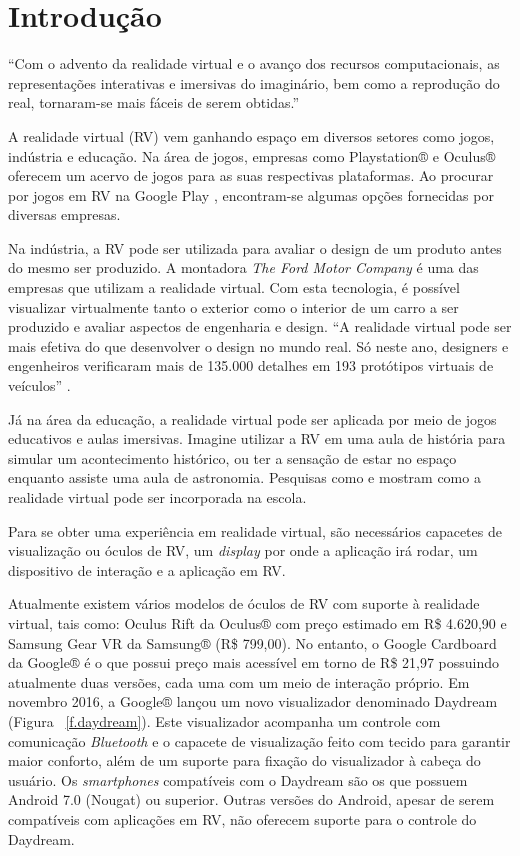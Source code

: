 \chapter{Introdução}
\label{c.introducao}

“Com o advento da realidade virtual e o avanço dos recursos computacionais, as representações interativas e imersivas do imaginário, bem como a reprodução do real, tornaram-se mais fáceis de serem obtidas.” \cite[p. ~9]{torilivro}

A realidade virtual (RV) vem ganhando espaço em diversos setores como jogos, indústria e educação. Na área de jogos, empresas como Playstation® e Oculus® oferecem um acervo de jogos para as suas respectivas plataformas. Ao procurar por jogos em RV na Google Play \cite{googleplay}, encontram-se algumas opções fornecidas por diversas empresas.

Na indústria, a RV pode ser utilizada para avaliar o design de um produto antes do mesmo ser produzido. A montadora \textit{The Ford Motor Company} é uma das empresas que utilizam a realidade virtual. Com esta tecnologia, é possível visualizar virtualmente tanto o exterior como o interior de um carro a ser produzido e avaliar aspectos de engenharia e design. “A realidade virtual pode ser mais efetiva do que desenvolver o design no mundo real. Só neste ano, designers e engenheiros verificaram mais de 135.000 detalhes em 193 protótipos virtuais de veículos” \cite[tradução nossa]{ford}. 

Já na área da educação, a realidade virtual pode ser aplicada por meio de jogos educativos e aulas imersivas. Imagine utilizar a RV em uma aula de história para simular um acontecimento histórico, ou ter a sensação de estar no espaço enquanto assiste uma aula de astronomia. Pesquisas como \cite{youngblut} e \cite{carvalho} mostram como a realidade virtual pode ser incorporada na escola.

Para se obter uma experiência em realidade virtual, são necessários capacetes de visualização ou óculos de RV, um \textit{display} por onde a aplicação irá rodar, um dispositivo de interação e a aplicação em RV. 

Atualmente existem vários modelos de óculos de RV com suporte à realidade virtual, tais como: Oculus Rift da Oculus® com preço estimado em R\$ 4.620,90 e Samsung Gear VR da Samsung® (R\$ 799,00). No entanto, o Google Cardboard da Google® é o que possui preço mais acessível em torno de R\$ 21,97 possuindo atualmente duas versões, cada uma com um meio de interação próprio. Em novembro 2016, a Google® lançou um novo visualizador denominado Daydream (Figura ~\ref{f.daydream}). Este visualizador acompanha um controle com comunicação \textit{Bluetooth} e o capacete de visualização feito com tecido para garantir maior conforto, além de um suporte para fixação do visualizador à cabeça do usuário. Os \textit{smartphones} compatíveis com o Daydream são os que possuem Android 7.0 (Nougat) ou superior. Outras versões do Android, apesar de serem compatíveis com aplicações em RV, não oferecem suporte para o controle do Daydream.

